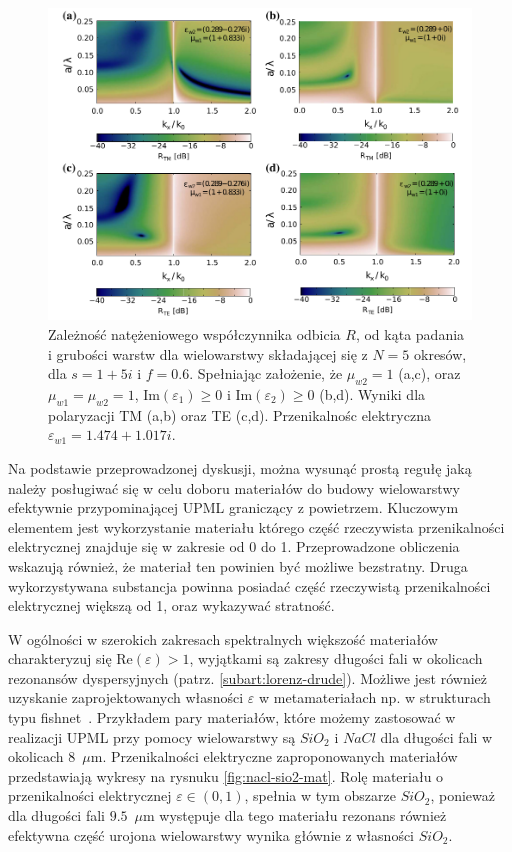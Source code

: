 \begin{figure}[tb]
	\includegraphics[width=\textwidth]{images/pml/fig5.png}
	\caption{Zależność natężeniowego współczynnika odbicia $R$, od kąta padania i grubości warstw dla wielowarstwy składającej się z $N=5$ okresów, dla $s=1+5i$ i $f=0.6$. Spełniając założenie, że $\mu_{w2}=1$ (a,c), oraz $\mu_{w1}=\mu_{w2}=1$, $\textrm{Im}(\varepsilon_1)\ge 0 $ i $\textrm{Im}(\varepsilon_2)\ge 0 $ (b,d). Wyniki dla polaryzacji TM (a,b) oraz TE (c,d). Przenikalnośc elektryczna $\varepsilon_{w1}=1.474+1.017i$.}
	\label{fig:pml-real-ref}
\end{figure}


Na podstawie przeprowadzonej dyskusji, można wysunąć prostą regułę jaką należy posługiwać się w celu doboru materiałów do budowy wielowarstwy efektywnie przypominającej UPML graniczący z powietrzem. Kluczowym elementem jest wykorzystanie materiału którego część rzeczywista przenikalności elektrycznej znajduje się w zakresie od 0 do 1. Przeprowadzone obliczenia wskazują również, że materiał ten powinien być możliwe bezstratny. Druga wykorzystywana substancja powinna posiadać część rzeczywistą przenikalności elektrycznej większą od 1, oraz wykazywać stratność. 

W ogólności w szerokich zakresach spektralnych większość materiałów charakteryzuj się $\textrm{Re}(\varepsilon) > 1$, wyjątkami są zakresy długości fali w okolicach rezonansów dyspersyjnych (patrz. \ref{subart:lorenz-drude}). Możliwe jest również uzyskanie zaprojektowanych własności $\varepsilon$ w metamateriałach np. w strukturach typu fishnet~\cite{valentine2008three}. Przykładem pary materiałów, które możemy zastosować w realizacji UPML przy pomocy wielowarstwy są $SiO_2$ i $NaCl$ dla długości fali w okolicach 8~$\mu$m. Przenikalności elektryczne zaproponowanych materiałów przedstawiają wykresy na rysnuku \ref{fig:nacl-sio2-mat}. Rolę materiału o przenikalności elektrycznej $\varepsilon \in (0,1)$, spełnia w tym obszarze $SiO_2$, ponieważ dla długości fali $9.5$~$\mu$m występuje dla tego materiału rezonans również efektywna część urojona wielowarstwy wynika głównie z własności $SiO_2$. 

